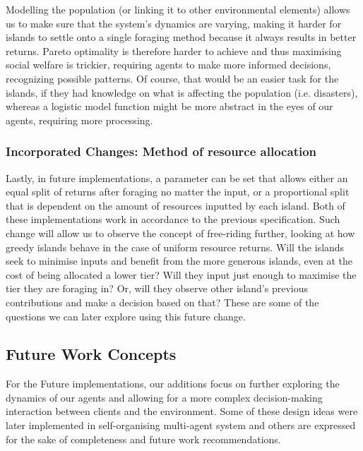 Modelling the population (or linking it to other environmental elements) allows us to make sure that the system’s dynamics are varying, making it harder for islands to settle onto a single foraging method because it always results in better returns. Pareto optimality is therefore harder to achieve and thus maximising social welfare is trickier, requiring agents to make more informed decisions, recognizing possible patterns. Of course, that would be an easier task for the islands, if they had knowledge on what is affecting the population (i.e. disasters), whereas a logistic model function might be more abstract in the eyes of our agents, requiring more processing. \\

\subsubsection{ Incorporated Changes: Method of resource allocation}

Lastly, in future implementations, a parameter can be set that allows either an equal split of returns after foraging no matter the input, or a proportional split that is dependent on the amount of resources inputted by each island. Both of these implementations work in accordance to the previous specification. Such change will allow us to observe the concept of free-riding further, looking at how greedy islands behave in the case of uniform resource returns. Will the islands seek to minimise inputs and benefit from the more generous islands, even at the cost of being allocated a lower tier? Will they input just enough to maximise the tier they are foraging in? Or, will they observe other island’s previous contributions and make a decision based on that? These are some of the questions we can later explore using this future change. \\

\subsection{Future Work Concepts}

For the Future implementations, our additions focus on further exploring the dynamics of our agents and allowing for a more complex decision-making interaction between clients and the environment. Some of these design ideas were later implemented in self-organising multi-agent system and others are expressed for the sake of completeness and future work recommendations.\\

